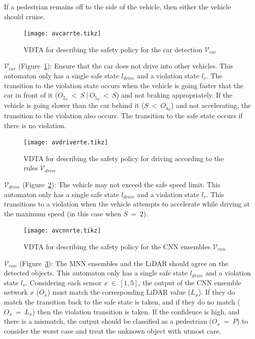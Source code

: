 If a pedestrian remains off to the side of the vehicle, then either the vehicle should cruise.

\begin{figure}[h]
	\centering
	\texttt{[image: avcarrte.tikz]}
	\caption{\ac{VDTA} for describing the safety policy for the car detection $\mathcal{V}_{car}$\label{fig:avcarrte}}
\end{figure}

$\mathcal{V}_{car}$ (Figure~\ref{fig:avcarrte}): Ensure that the car does not drive into other vehicles. 
This automaton only has a single safe state $l_{drive}$ and a violation state $l_v$.
The transition to the violation state occurs when the vehicle is going faster that the car in front of it ($O_{2_S}~<~S~|~O_{5_S}~<~S$) and not braking appropriately.
If the vehicle is going slower than the car behind it ($S~<~O_{4_S}$) and not accelerating, the transition to the violation also occurs.
The transition to the safe state occurs if there is no violation.

\begin{figure}[h]
	\centering
	\texttt{[image: avdriverte.tikz]}
	\caption{\ac{VDTA} for describing the safety policy for driving according to the rules $\mathcal{V}_{drive}$\label{fig:avdriverte}}
\end{figure}

$\mathcal{V}_{drive}$ (Figure~\ref{fig:avdriverte}): The vehicle may not exceed the safe speed limit. 
This automaton only has a single safe state $l_{drive}$ and a violation state $l_v$.
This transitions to a violation when the vehicle attempts to accelerate while driving at the maximum speed (in this case when $S~=~2$).

\begin{figure}[h]
	\centering
	\texttt{[image: avcnnrte.tikz]}
	\caption{\ac{VDTA} for describing the safety policy for the \ac{CNN} ensembles $\mathcal{V}_{cnn}$\label{fig:avcnnrte}}
\end{figure}

$\mathcal{V}_{cnn}$ (Figure~\ref{fig:avcnnrte}): The \ac{MNN} ensembles and the \ac{LiDAR} should agree on the detected objects.
This automaton only has a single safe state $l_{drive}$ and a violation state $l_v$.
Considering each sensor $x~\in~[1,5]$, the output of the \ac{CNN} ensemble network $x$ ($O_x$) must match the corresponding \ac{LiDAR} value ($L_x$).
If they do match the transition back to the safe state is taken, and if they do no match ($\overline{O_x~=~L_x}$) then the violation transition is taken.
If the confidence is high, and there is a mismatch, the output should be classified as a pedestrian ($O_x~=~P$) to consider the worst case and treat the unknown object with utmost care.

